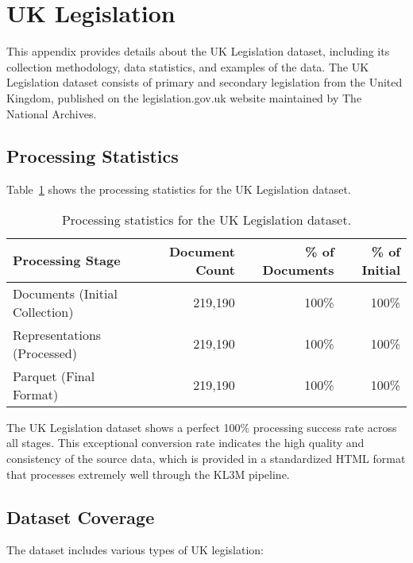 \section{UK Legislation}
\label{appendix:ukleg}

This appendix provides details about the UK Legislation dataset, including its collection methodology, data statistics, and examples of the data. The UK Legislation dataset consists of primary and secondary legislation from the United Kingdom, published on the legislation.gov.uk website maintained by The National Archives.

\subsection{Processing Statistics}

Table~\ref{table:ukleg-stats} shows the processing statistics for the UK Legislation dataset.

\begin{table}[h]
\centering
\begin{tabular}{|l|r|r|r|}
\hline
\textbf{Processing Stage} & \textbf{Document Count} & \textbf{\% of Documents} & \textbf{\% of Initial} \\
\hline
Documents (Initial Collection) & 219,190 & 100\% & 100\% \\
Representations (Processed) & 219,190 & 100\% & 100\% \\
Parquet (Final Format) & 219,190 & 100\% & 100\% \\
\hline
\end{tabular}
\caption{Processing statistics for the UK Legislation dataset.}
\label{table:ukleg-stats}
\end{table}

The UK Legislation dataset shows a perfect 100\% processing success rate across all stages. This exceptional conversion rate indicates the high quality and consistency of the source data, which is provided in a standardized HTML format that processes extremely well through the KL3M pipeline.

\subsection{Dataset Coverage}

The dataset includes various types of UK legislation:

